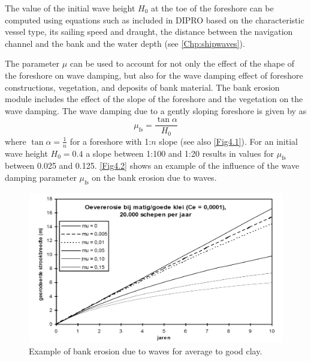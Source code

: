 %
The value of the initial wave height $H_0$ at the toe of the foreshore can be computed using equations such as included in DIPRO based on the characteristic vessel type, its sailing speed and draught, the distance between the navigation channel and the bank and the water depth (see \autoref{Chp:shipwaves}).

The parameter $\mu$ can be used to account for not only the effect of the shape of the foreshore on wave damping, but also for the wave damping effect of foreshore constructions, vegetation, and deposits of bank material.
The bank erosion module includes the effect of the slope of the foreshore and the vegetation on the wave damping.
The wave damping due to a gently sloping foreshore is given by \citet{Verheij00} as
%
\begin{equation}
\mu_\text{fs} = \frac{\tan \alpha}{H_0}
\end{equation}
%
where $\tan \alpha = \frac{1}{n}$ for a foreshore with 1:$n$ slope (see also \autoref{Fig4.1}).
For an initial wave height $H_0 = 0.4$ a slope between 1:100 and 1:20 results in values for $\mu_\text{fs}$ between 0.025 and 0.125.
\autoref{Fig4.2} shows an example of the influence of the wave damping parameter $\mu_\text{fs}$ on the bank erosion due to waves.

\begin{figure}
\includegraphics[width=\textwidth]{figures/Fig4-2.png}
\caption{Example of bank erosion due to waves for average to good clay.}
\label{Fig4.2}
\end{figure}

